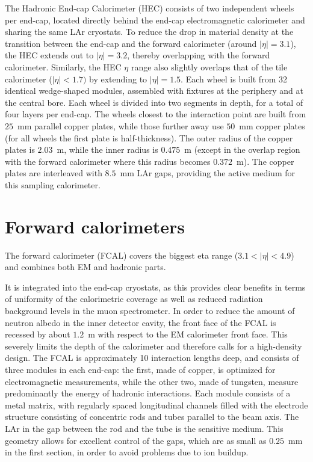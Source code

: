 The Hadronic End-cap Calorimeter (HEC) consists of two
independent wheels per end-cap, located directly behind the end-cap electromagnetic calorimeter
and sharing the same LAr cryostats. To reduce the drop in material density at the transition between
the end-cap and the forward calorimeter (around $|\eta| = 3.1$), the HEC extends out to $|\eta| = 3.2$,
thereby overlapping with the forward calorimeter. Similarly, the HEC $\eta$ range also slightly overlaps
that of the tile calorimeter ($|\eta| < 1.7)$ by extending to $|\eta| = 1.5$. Each wheel is built from 32
identical wedge-shaped modules, assembled with fixtures at the periphery and at the central bore.
Each wheel is divided into two segments in depth, for a total of four layers per end-cap. The wheels
closest to the interaction point are built from $25$~mm parallel copper plates, while those further away
use $50$~mm copper plates (for all wheels the first plate is half-thickness). The outer radius of the
copper plates is $2.03$~m, while the inner radius is $0.475$~m (except in the overlap region with the
forward calorimeter where this radius becomes $0.372$~m). The copper plates are interleaved with
$8.5$~mm LAr gaps, providing the active medium for this sampling calorimeter.

\section{Forward calorimeters}
\label{sec:ATLAS_FCAL}

The forward calorimeter (FCAL) covers the biggest eta range ($3.1 < |\eta| < 4.9$) and combines both EM and hadronic parts.

It is integrated into the end-cap cryostats, as this provides
clear benefits in terms of uniformity of the calorimetric coverage as well as
reduced radiation background levels in the muon spectrometer. In order to reduce the amount of
neutron albedo in the inner detector cavity, the front face of the FCAL is recessed by about $1.2$~m
with respect to the EM calorimeter front face. This severely limits the depth of the calorimeter
and therefore calls for a high-density design. The FCAL is approximately 10 interaction lengths
deep, and consists of three modules in each end-cap: the first, made of copper, is optimized for
electromagnetic measurements, while the other two, made of tungsten, measure predominantly the
energy of hadronic interactions. Each module consists of a metal matrix, with regularly spaced
longitudinal channels filled with the electrode structure consisting of concentric rods and tubes
parallel to the beam axis. The LAr in the gap between the rod and the tube is the sensitive medium.
This geometry allows for excellent control of the gaps, which are as small as $0.25$~mm in the first
section, in order to avoid problems due to ion buildup.

